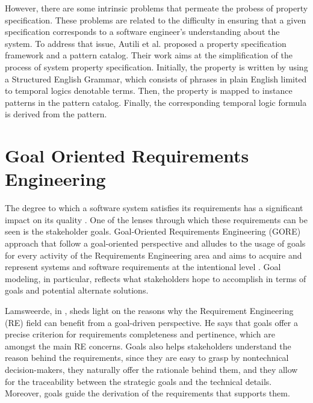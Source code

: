 However, there are some intrinsic problems that permeate the probess of property specification. These problems are related to the difficulty in ensuring that a given specification corresponds to a software engineer's understanding about the system. To address that issue, Autili et al. \cite{2015PropertySpecCatalog} proposed a property specification  framework and a pattern catalog. Their work aims at the simplification of the process of system property specification. Initially, the property is written by using a Structured English Grammar, which consists of phrases in plain English limited to temporal logics denotable terms. Then, the property is mapped to instance patterns in the pattern catalog. Finally, the corresponding temporal logic formula is derived from the pattern.




\section{Goal Oriented Requirements Engineering} \label{sec:bgGORE}

The degree to which a software system satisfies its requirements has a significant impact on its quality \cite{Horkoff2019}. One of the lenses through which these requirements can be seen is the stakeholder goals. Goal-Oriented Requirements Engineering (GORE) approach that follow a goal-oriented perspective and alludes to the usage of goals for every activity of the Requirements Engineering area and aims to acquire and represent systems and software requirements at the intentional level \cite{van_lamsweerde_system_2003}. 
Goal modeling, in particular, reflects what stakeholders hope to accomplish in terms of goals and potential alternate solutions. 

Lamsweerde, in \cite{2001Lamsweerde}, sheds light on the reasons why the Requirement Engineering (RE) field can benefit from a goal-driven perspective. He says that goals offer a precise criterion for requirements completeness and pertinence, which are amongst the main RE concerns. Goals also helps stakeholders understand the reason behind the requirements, since they are easy to grasp by nontechnical decision-makers, they naturally offer the rationale behind them, and they allow for the traceability between the strategic goals and the technical details. Moreover, goals guide the derivation of the requirements that supports them.

